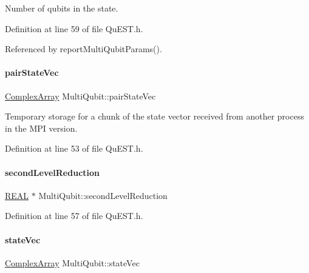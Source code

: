 Number of qubits in the state. 



Definition at line 59 of file Qu\+E\+S\+T.\+h.



Referenced by report\+Multi\+Qubit\+Params().

\mbox{\label{structMultiQubit_a76f7db4eab52d2b30f58f973ada809c5}} 
\paragraph{\texorpdfstring{pair\+State\+Vec}{pairStateVec}}
{\footnotesize\ttfamily \mbox{\hyperlink{structComplexArray}{Complex\+Array}} Multi\+Qubit\+::pair\+State\+Vec}



Temporary storage for a chunk of the state vector received from another process in the M\+PI version. 



Definition at line 53 of file Qu\+E\+S\+T.\+h.

\mbox{\label{structMultiQubit_a3e859cefa146ec7b30464ab3d897930b}} 
\paragraph{\texorpdfstring{second\+Level\+Reduction}{secondLevelReduction}}
{\footnotesize\ttfamily \mbox{\hyperlink{QuEST__precision_8h_a4b654506f18b8bfd61ad2a29a7e38c25}{R\+E\+AL}} $\ast$ Multi\+Qubit\+::second\+Level\+Reduction}



Definition at line 57 of file Qu\+E\+S\+T.\+h.

\mbox{\label{structMultiQubit_a45483190d6b01ef6b2f98f2bec9ab94f}} 
\paragraph{\texorpdfstring{state\+Vec}{stateVec}}
{\footnotesize\ttfamily \mbox{\hyperlink{structComplexArray}{Complex\+Array}} Multi\+Qubit\+::state\+Vec}



